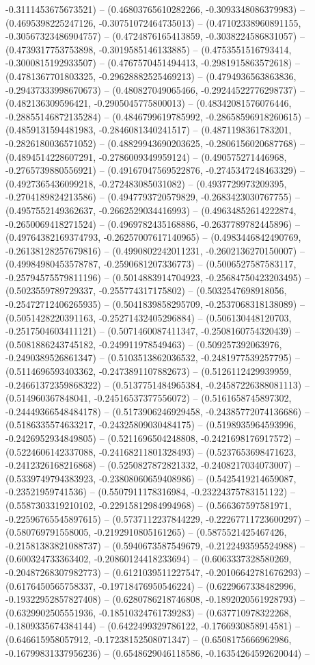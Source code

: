 -0.3111453675673521) -- (0.46803765610282266, -0.3093348086379983) -- (0.4695398225247126, -0.30751072464735013) -- (0.47102338960891155, -0.30567323486904757) -- (0.4724876165413859, -0.3038224586831057) -- (0.4739317753753898, -0.3019585146133885) -- (0.4753551516793414, -0.3000815192933507) -- (0.4767570451494413, -0.2981915863572618) -- (0.4781367701803325, -0.29628882525469213) -- (0.4794936563863836, -0.29437333998670673) -- (0.480827049065466, -0.29244522776298737) -- (0.482136309596421, -0.2905045775800013) -- (0.48342081576076446, -0.28855146872135284) -- (0.4846799619785992, -0.28658596918260615) -- (0.4859131594481983, -0.2846081340241517) -- (0.4871198361783201, -0.2826180036571052) -- (0.48829943690203625, -0.2806156020687768) -- (0.4894514228607291, -0.2786009349959124) -- (0.490575271446968, -0.2765739880556921) -- (0.49167047569522876, -0.2745347248463329) -- (0.4927365436099218, -0.272483085031082) -- (0.4937729973209395, -0.2704189824213586) -- (0.4947793720579829, -0.2683423030767755) -- (0.4957552149362637, -0.2662529034416993) -- (0.49634852614222874, -0.2650069418271524) -- (0.4969782435168886, -0.2637789782445896) -- (0.49764382169374793, -0.26257007617140965) -- (0.4983446842490769, -0.26138128257679816) -- (0.4990802242011231, -0.2602136270150007) -- (0.49984980453578787, -0.2590681207336773) -- (0.5006527587583117, -0.25794575579811196) -- (0.5014883914704923, -0.25684750423203495) -- (0.5023559789729337, -0.255774317175802) -- (0.5032547698918056, -0.25472712406265935) -- (0.5041839858295709, -0.2537068318138089) -- (0.5051428220391163, -0.25271432405296884) -- (0.506130448120703, -0.2517504603411121) -- (0.5071460087411347, -0.2508160754320439) -- (0.5081886243745182, -0.249911978549463) -- (0.509257392063976, -0.2490389526861347) -- (0.5103513862036532, -0.2481977539257795) -- (0.5114696593403362, -0.2473891107882673) -- (0.5126112429939959, -0.24661372359868322) -- (0.5137751484965384, -0.24587226388081113) -- (0.514960367848041, -0.24516537377556072) -- (0.5161658745897302, -0.24449366548484178) -- (0.5173906246929458, -0.24385772074136686) -- (0.5186335574633217, -0.24325809030484175) -- (0.5198935964593996, -0.2426952934849805) -- (0.5211696504248808, -0.2421698176917572) -- (0.5224606142337088, -0.24168211801328493) -- (0.5237653698471623, -0.2412326168216868) -- (0.5250827872821332, -0.2408217034073007) -- (0.5339749794383923, -0.23808060659408986) -- (0.5425419214659087, -0.23521959741536) -- (0.5507911178316984, -0.23224375783151122) -- (0.5587303319210102, -0.22915812984994968) -- (0.566367597581971, -0.22596765545897615) -- (0.5737112237844229, -0.22267711723600297) -- (0.580769791558005, -0.2192910805161265) -- (0.5875521425467426, -0.21581383821088737) -- (0.5940673587549679, -0.2122493595524988) -- (0.600324733363402, -0.20860124418233694) -- (0.6063337328580269, -0.20487268307982773) -- (0.6121039511227547, -0.20106642781676293) -- (0.6176450565758337, -0.19718476950546224) -- (0.6229667338482996, -0.19322952857827408) -- (0.6280786218746808, -0.1892020561928793) -- (0.6329902505551936, -0.18510324761739283) -- (0.637710978322268, -0.1809335674384144) -- (0.6422499329786122, -0.1766930858914581) -- (0.646615958057912, -0.17238152508071347) -- (0.6508175666962986, -0.16799831337956236) -- (0.6548629046118586, -0.16354264592620044) -- 